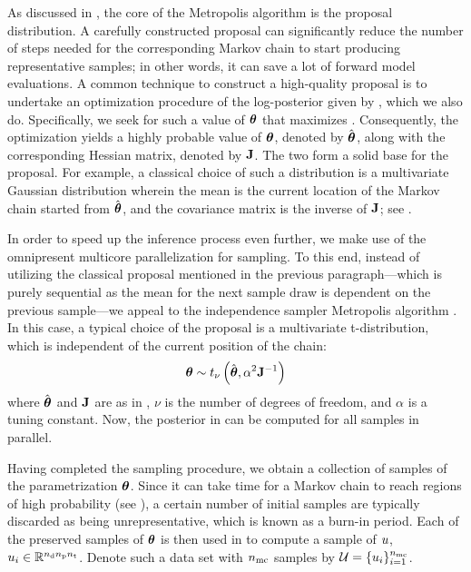 As discussed in , the core of the Metropolis algorithm is the proposal distribution. A carefully constructed proposal can significantly reduce the number of steps needed for the corresponding Markov chain to start producing representative samples; in other words, it can save a lot of forward model evaluations.
A common technique to construct a high-quality proposal is to undertake an optimization procedure of the log-posterior given by , which we also do. Specifically, we seek for such a value of ${\boldsymbol\theta}$ that maximizes .
Consequently, the optimization yields a highly probable value of ${\boldsymbol\theta}$, denoted by $\hat{{\boldsymbol\theta}}$, along with the corresponding Hessian matrix, denoted by $\mathbf{J}$. The two form a solid base for the proposal.
For example, a classical choice of such a distribution is a multivariate Gaussian distribution wherein the mean is the current location of the Markov chain started from $\hat{{\boldsymbol\theta}}$, and the covariance matrix is the inverse of $\mathbf{J}$; see \cite{gelman2004, bernardo2007}.

In order to speed up the inference process even further, we make use of the omnipresent multicore parallelization for sampling. To this end, instead of utilizing the classical proposal mentioned in the previous paragraph---which is purely sequential as the mean for the next sample draw is dependent on the previous sample---we appeal to the independence sampler Metropolis algorithm \cite{gelman2004}. In this case, a typical choice of the proposal is a multivariate t-distribution, which is independent of the current position of the chain:
\begin{equation} \elabel{proposal}
  \vparam \sim \studentst{\nu}{\hat{\vparam}}{\alpha^2 \mOI^{-1}}
\end{equation}
where $\hat{{\boldsymbol\theta}}$ and $\mathbf{J}$ are as in , $\nu$ is the number of degrees of freedom, and $\alpha$ is a tuning constant. Now, the posterior in  can be computed for all samples in parallel.

Having completed the sampling procedure, we obtain a collection of samples of the parametrization ${\boldsymbol\theta}$. Since it can take time for a Markov chain to reach regions of high probability (see ), a certain number of initial samples are typically discarded as being unrepresentative, which is known as a burn-in period.
Each of the preserved samples of ${\boldsymbol\theta}$ is then used in  to compute a sample of $u$, $u_i \in \mathbb{R}^{{n_\text{d}} {n_\text{p}} {n_\text{t}}}$.
Denote such a data set with ${n_\text{mc}}$ samples by $\mathcal{U} = \{ u_i \}_{i = 1}^{n_\text{mc}}$.

